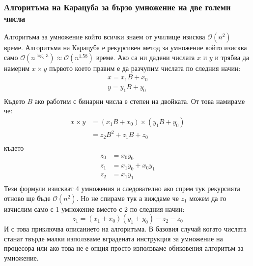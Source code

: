 \subsubsection{Алгоритъма на Карацуба за бързо умножение на две големи числа}
Алгоритъма за умножение който всички знаем от училище изисква $\mathcal{O}(n^2)$ време. Алгоритъма на Карацуба е рекурсивен метод за умножение който изисква само $\mathcal{O}(n^{\log_2 3}) \approx \mathcal{O}(n^{1.58})$ време. Ако са ни дадени числата $x$ и $y$ и трябва да намерим $x \times y$ първото което правим е да разчупим числата по следния начин:
\begin{equation*}
\begin{split}
  x = x_1B+x_0 \\
  y = y_1B+y_0 \\
\end{split}
\end{equation*}
Където $B$ ако работим с бинарни числа е степен на двойката. От това намираме че:
\begin{equation*}
\begin{split}
  x \times y &= (x_1B+x_0) \times (y_1B+y_0) \\
             &= z_2B^2+z_1B+z_0 \\
\end{split}
\end{equation*}
където
\begin{equation*}
\begin{split}
  z_0 &= x_0y_0 \\
  z_1 &= x_1y_0 + x_0y_1 \\
  z_2 &= x_1y_1 \\
\end{split}
\end{equation*}
Тези формули изискват 4 умножения и следователно ако спрем тук рекурсията отново ще бъде $\mathcal{O}(n^2)$. Но не спираме тук а виждаме че $z_1$ можем да го изчислим само с 1 умножение вместо с 2 по следния начин:
$$ z_1 = (x_1+x_0)(y_1+y_0) - z_2 - z_0 $$
И с това приключва описанието на алгоритъма. В базовия случай когато числата станат твърде малки използваме вградената инструкция за умножение на процесора или ако това не е опция просто използваме обиковения алгоритъм за умножение.


